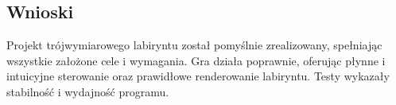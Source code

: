 \documentclass{article}
\begin{document}
\subsection{Wnioski}
Projekt trójwymiarowego labiryntu został pomyślnie zrealizowany, spełniając wszystkie założone cele i wymagania. Gra działa poprawnie, oferując płynne i intuicyjne sterowanie oraz prawidłowe renderowanie labiryntu. Testy wykazały stabilność i wydajność programu. 
\end{document}
